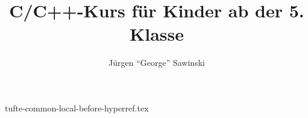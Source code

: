 \begin{filecontents}{tufte-common-local-before-hyperref.tex}
\usepackage{graphicx}
  \graphicspath{{graphics/}}
\usepackage{booktabs}
\usepackage{multicol}
\usepackage{fancyvrb}
\usepackage{minted-code}
\usepackage{xspace}
\usepackage{amsmath}
\usepackage{siunitx}
\usepackage{makeidx}\makeindex
\usepackage[ngerman]{babel}
\usepackage[utf8]{inputenc}
\usepackage{csquotes}
\usepackage[table]{xcolor}
\end{filecontents}


\documentclass[%
  justified,
  notoc,
  hyperref]{xtufte-book}

\usepackage{c-kurs}

\title{C/C++-Kurs für Kinder ab der 5. Klasse}
\author{Jürgen ``George'' Sawinski}




 
\frontmatter



\newpage
\thispagestyle{empty}
\null

\newpage

\null\vfill
\thispagestyle{empty}
\setlength{\parindent}{0pt}
\setlength{\parskip}{\baselineskip}

